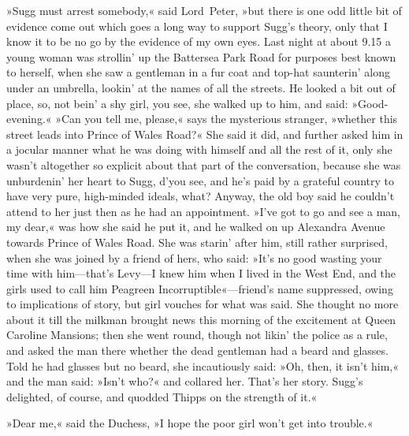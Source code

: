 »Sugg must arrest somebody,« said Lord~Peter, »but there is one odd little bit of evidence come out which goes a long way to support Sugg's theory, only that I know it to be no go by the evidence of my own eyes. Last night at about 9.15 a young woman was strollin' up the Battersea Park Road for purposes best known to herself, when she saw a gentleman in a fur coat and top-hat saunterin' along under an umbrella, lookin' at the names of all the streets. He looked a bit out of place, so, not bein' a shy girl, you see, she walked up to him, and said: »Good-evening.« »Can you tell me, please,« says the mysterious stranger, »whether this street leads into Prince of Wales Road?« She said it did, and further asked him in a jocular manner what he was doing with himself and all the rest of it, only she wasn't altogether so explicit about that part of the conversation, because she was unburdenin' her heart to Sugg, d'you see, and he's paid by a grateful country to have very pure, high-minded ideals, what? Anyway, the old boy said he couldn't attend to her just then as he had an appointment. »I've got to go and see a man, my dear,« was how she said he put it, and he walked on up Alexandra Avenue towards Prince of Wales Road. She was starin' after him, still rather surprised, when she was joined by a friend of hers, who said: »It's no good wasting your time with him—that's Levy—I knew him when I lived in the West End, and the girls used to call him Peagreen Incorruptible«---friend's name suppressed, owing to implications of story, but girl vouches for what was said. She thought no more about it till the milkman brought news this morning of the excitement at Queen Caroline Mansions; then she went round, though not likin' the police as a rule, and asked the man there whether the dead gentleman had a beard and glasses. Told he had glasses but no beard, she incautiously said: »Oh, then, it isn't him,« and the man said: »Isn't who?« and collared her. That's her story. Sugg's delighted, of course, and quodded Thipps on the strength of it.«

»Dear me,« said the Duchess, »I hope the poor girl won't get into trouble.«

